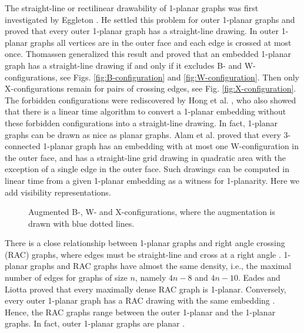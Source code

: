 \documentclass[runningheads]{llncs}
\begin{document}
The straight-line or rectilinear drawability of 1-planar graphs was
first investigated by Eggleton \cite{e-rdg-86}. He settled this
problem for outer 1-planar graphs and proved that every outer
1-planar graph has a straight-line drawing. In outer 1-planar graphs
all vertices are in the outer face and each edge is crossed at most
once. Thomassen \cite{t-rdg-88} generalized this result and proved
that an embedded 1-planar graph has a straight-line  drawing if and
only if it excludes B- and W-configurations, see Figs.
\ref{fig:B-configuration} and \ref{fig:W-configuration}. Then only
X-configurations remain for pairs of crossing edges, see Fig.
\ref{fig:X-configuration}. The forbidden configurations were
rediscovered by Hong et al. \cite{help-ft1pg-12}, who also showed
that there is a linear time algorithm to convert a 1-planar
embedding without these forbidden configurations into a
straight-line drawing. In fact, 1-planar graphs can be drawn as nice
as planar graphs. Alam et al. \cite{abk-sld3c-13} proved that every
3-connected 1-planar graph has an embedding with at most one
W-configuration in the outer face, and has a straight-line grid
drawing in quadratic area with the exception of a single edge in the
outer face. Such  drawings can be computed in linear time from a
given 1-planar embedding as a witness for 1-planarity. Here we add
visibility representations.

\begin{figure}
  \centering
  \hfil
\hfil
  \caption{Augmented B-, W- and X-configurations, where the augmentation
  is drawn with blue dotted lines.
  \label{fig:BWXconfig}}
\end{figure}

There is a close relationship  between  1-planar graphs and right
angle crossing (RAC) graphs, where edges must be straight-line and
cross at a right angle \cite{del-dgrac-11}. 1-planar graphs and RAC
graphs have almost the same density, i.e., the maximal number of
edges for graphs of size $n$, namely $4n-8$ and $4n-10$. Eades and
Liotta \cite{el-racg1p-13} proved that every maximally dense RAC
graph is 1-planar. Conversely, every outer 1-planar graph has a RAC
drawing with the same embedding \cite{de-eogracd-12}. Hence, the RAC
graphs range between the outer 1-planar and the 1-planar graphs. In
fact,
outer 1-planar graphs are planar \cite{abbghnr-ro1pglt-13}.\\
\end{document}
